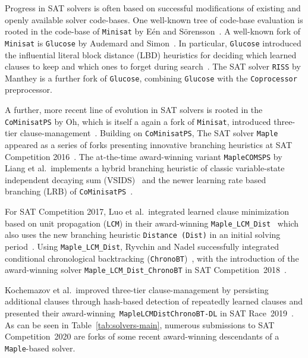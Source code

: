 \documentclass{elsarticle}
\newcommand{\solver}[1]{\texttt{#1}}
\begin{document}
Progress in SAT solvers is often based on successful modifications of existing and openly available solver code-bases. 
One well-known tree of code-base evaluation is rooted in the code-base of \solver{Minisat} by E\'en and S\"orensson~\cite{Niklas:2003:Minisat}. 
A well-known fork of \solver{Minisat} is \solver{Glucose} by Audemard and Simon~\cite{Audemard:2018:Glucose}. 
In particular, \solver{Glucose} introduced the influential literal block distance (LBD) heuristics for deciding which learned clauses to keep and which 
ones to forget during search~\cite{Audemard:2009:Glucose}. 
The SAT solver \solver{RISS} by Manthey is a further fork of \solver{Glucose}, combining \solver{Glucose}  with 
 the \solver{Coprocessor}~\cite{Manthey:2012:Coprocessor2} preprocessor. 

A further, more recent line of evolution in SAT solvers
is rooted in the \solver{CoMinisatPS} by Oh, which is itself a again a fork of \solver{Minisat}, introduced three-tier clause-management~\cite{Oh:2015:satunsat}. 
Building on \solver{CoMinisatPS}, 
The SAT solver \solver{Maple} appeared as a series of forks presenting innovative branching heuristics at SAT Competition 2016~\cite{Liang:2016:LRB}. 
The at-the-time award-winning variant \solver{MapleCOMSPS} by Liang et al.~implements a hybrid branching heuristic of classic variable-state independent decaying sum (VSIDS)~\cite{Zhang:2001:ClauseLearning} and the newer learning rate based branching (LRB) of \solver{CoMinisatPS}~\cite{Liang:2016:MapleCOMSPS}. 

For SAT Competition 2017, Luo et al.~integrated learned clause minimization based on unit propagation (\solver{LCM}) in their award-winning \solver{Maple\_LCM\_Dist}~\cite{Luo:2017:LCM} which also uses the new branching heuristic \solver{Distance (Dist)} in an initial solving period~\cite{Xiao:2017:MapleLCMDist}. 
Using \solver{Maple\_LCM\_Dist}, Ryvchin and Nadel successfully integrated conditional chronological backtracking (\solver{ChronoBT})~\cite{Nadel:2018:CBT}, with
the introduction of the award-winning solver \solver{Maple\_LCM\_Dist\_ChronoBT} in SAT Competition~2018~\cite{Ryvchin:SC2018:MapleChronoBT}. 

Kochemazov et al.~improved three-tier clause-management by persisting
additional clauses through hash-based detection of repeatedly learned clauses and presented their award-winning~\solver{MapleLCMDistChronoBT-DL} in SAT Race~2019~\cite{Kochemazov:SC2019:MapleChronoBTDL}. 
As can be seen in Table~\ref{tab:solvers-main}, numerous submissions to SAT Competition~2020 are forks of some recent award-winning descendants of a \solver{Maple}-based solver. 
\end{document}
